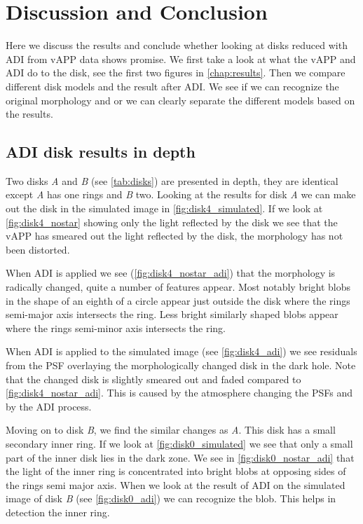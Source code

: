 \chapter{Discussion and Conclusion}

%
%
%
%
%
%
%
%
%

Here we discuss the results and conclude whether looking at disks reduced with \ac{ADI} from \ac{vAPP} data shows promise. We first take a look at what the \ac{vAPP} and \ac{ADI} do to the disk, see the first two figures in \autoref{chap:results}. Then we compare different disk models and the result after \ac{ADI}. We see if we can recognize the original morphology and or we can clearly separate the different models based on the results. 

\section{ADI disk results in depth}
\label{sec:adi_res}

    Two disks \textit{A} and \textit{B} (see \autoref{tab:disks}) are presented in depth, they are identical except \textit{A} has one rings and \textit{B} two. Looking at the results for disk \textit{A} we can make out the disk in the simulated image in \autoref{fig:disk4_simulated}. If we look at \autoref{fig:disk4_nostar} showing only the light reflected by the disk we see that the \ac{vAPP} has smeared out the light reflected by the disk, the morphology has not been distorted.

    When \ac{ADI} is applied we see (\autoref{fig:disk4_nostar_adi}) that the morphology is radically changed, quite a number of features appear. Most notably bright blobs in the shape of an eighth of a circle appear just outside the disk where the rings semi-major axis intersects the ring. Less bright similarly shaped blobs appear where the rings semi-minor axis intersects the ring.

    When \ac{ADI} is applied to the simulated image (see \autoref{fig:disk4_adi}) we see residuals from the \ac{PSF} overlaying the morphologically changed disk in the dark hole. Note that the changed disk is slightly smeared out and faded compared to \autoref{fig:disk4_nostar_adi}. This is caused by the atmosphere changing the \acp{PSF} and by the \ac{ADI} process.


Moving on to disk \textit{B}, we find the similar changes as \textit{A}. This disk has a small secondary inner ring. If we look at \autoref{fig:disk0_simulated} we see that only a small part of the inner disk lies in the dark zone. We see in \autoref{fig:disk0_nostar_adi} that the light of the inner ring is concentrated into bright blobs at opposing sides of the rings semi major axis. When we look at the result of \ac{ADI} on the simulated image of disk \textit{B} (see \autoref{fig:disk0_adi}) we can recognize the blob. This helps in detection the inner ring.

